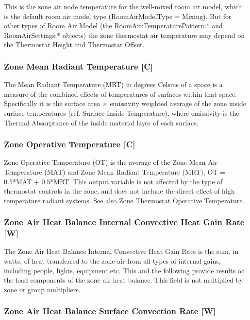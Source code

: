 This is the zone air node temperature for the well-mixed room air model, which is the default room air model type (RoomAirModelType = Mixing). But for other types of Room Air Model (the RoomAir:TemperaturePattern:* and RoomAirSettings:* objects) the zone thermostat air temperature may depend on the Thermostat Height and Thermostat Offset.

\subsubsection{Zone Mean Radiant Temperature {[}C{]}}\label{zone-mean-radiant-temperature-c}

The Mean Radiant Temperature (MRT) in degrees Celsius of a space is a measure of the combined effects of temperatures of surfaces within that space. Specifically it is the surface area × emissivity weighted average of the zone inside surface temperatures (ref. Surface Inside Temperature), where emissivity is the Thermal Absorptance of the inside material layer of each surface.

\subsubsection{Zone Operative Temperature {[}C{]}}\label{zone-operative-temperature-c}

Zone Operative Temperature (OT) is the average of the Zone Mean Air Temperature (MAT) and Zone Mean Radiant Temperature (MRT), OT = 0.5*MAT + 0.5*MRT. This output variable is not affected by the type of thermostat controls in the zone, and does not include the direct effect of high temperature radiant systems. See also Zone Thermostat Operative Temperature.

\subsubsection{Zone Air Heat Balance Internal Convective Heat Gain Rate {[}W{]}}\label{zone-air-heat-balance-internal-convective-heat-gain-rate-w}

The Zone Air Heat Balance Internal Convective Heat Gain Rate is the sum, in watts, of heat transferred to the zone air from all types of internal gains, including people, lights, equipment etc. This and the following provide results on the load components of the zone air heat balance. This field is not multiplied by zone or group multipliers.

\subsubsection{Zone Air Heat Balance Surface Convection Rate {[}W{]}}\label{zone-air-heat-balance-surface-convection-rate-w}

